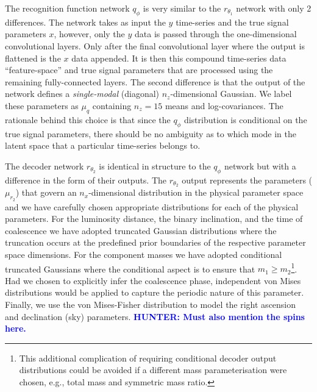 \documentclass[%
showpacs,
nofootinbib,
 amsmath,amssymb,
 aps,
 twocolumn,
 prl,
 reprint,
floatfix,
]{revtex4-1}
\newcommand{\hunter}[1]{\textbf{\textcolor{blue}{HUNTER: #1}}}
\begin{document}
%
% 
The recognition function network $q_{\phi}$ is very similar to the
$r_{\theta_1}$ network with only 2 differences. The network takes as input the
$y$ time-series and the true signal parameters $x$, however, only the $y$ data
is passed through the one-dimensional convolutional layers. Only after the
final convolutional layer where the output is flattened is the $x$ data
appended. It is then this compound time-series data ``feature-space'' and true
signal parameters that are processed using the remaining fully-connected
layers. The second difference is that the output of the network defines a
\emph{single-modal} (diagonal) $n_z$-dimensional Gaussian. We label these
parameters as $\mu_{q}$ containing $n_z=15$ means and log-covariances. The
rationale behind this choice is that since the $q_{\phi}$ distribution is
conditional on the true signal parameters, there should be no ambiguity as to
which mode in the latent space that a particular time-series belongs to.      

%
%
The decoder network $r_{\theta_2}$ is identical in structure to the
$q_{\phi}$ network but with a difference in the form of their outputs. The
$r_{\theta_2}$ output represents the parameters ($\mu_{r_2}$) that govern an
$n_x$-dimensional distribution in the physical parameter space and we have
carefully chosen appropriate distributions for each of the physical parameters.
For the luminosity distance, the binary inclination, and the time of
coalescence we have adopted truncated Gaussian distributions where the
truncation occurs at the predefined prior boundaries of the respective
parameter space dimensions. For the component masses we have adopted
conditional truncated Gaussians where the conditional aspect is to ensure that
$m_{1}\geq m_{2}$\footnote{This additional complication of requiring conditional
decoder output distributions could be avoided if a different mass
parameterisation were chosen, e.g., total mass and symmetric mass ratio.}. Had
we chosen to explicitly infer the coalescence phase,
independent von Mises distributions would be applied to capture the periodic
nature of this parameter. Finally, we use the von Mises-Fisher distribution
to model the right ascension and declination (sky) parameters.  \hunter{Must 
also mention the spins here.}    

%
%
\end{document}
